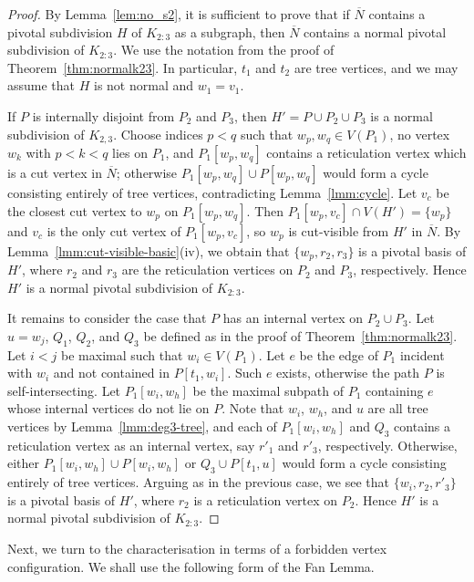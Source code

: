 \documentclass[pdflatex,sn-mathphys-num]{sn-jnl}
\theoremstyle{thmstyleone}%
\theoremstyle{thmstyletwo}%
\theoremstyle{thmstylethree}%
\begin{document}
\begin{proof}
By Lemma~\ref{lem:no_s2}, it is sufficient to prove that if $\overline{N}$ contains a pivotal subdivision $H$ of $K_{2:3}$ as a subgraph, then  $\overline{N}$ contains a normal pivotal subdivision of $K_{2:3}$.
We use the notation from the proof of Theorem~\ref{thm:normalk23}. In particular, $t_1$ and $t_2$ are tree vertices, and we may assume that $H$ is not normal and $w_1=v_1$.

If $P$ is internally disjoint from $P_2$ and $P_3$, then $H'=P \cup P_2 \cup P_3$ is a normal subdivision of $K_{2,3}$. 
Choose indices $p<q$ such that $w_p,w_q\in V(P_1)$, no vertex $w_k$ with $p<k<q$ lies on $P_1$, and $P_1[w_p,w_q]$ contains a reticulation vertex which is a cut vertex in $\overline{N}$; otherwise $P_1[w_p,w_q] \cup P[w_p,w_q] $ would form a cycle consisting entirely of tree vertices, contradicting Lemma~\ref{lmm:cycle}.
Let $v_c$ be the closest cut vertex to $w_p$ on $P_1[w_p,w_q]$. Then $P_1[w_p, v_c] \cap V(H')=\{w_p\}$ and $v_c$ is the only cut vertex of $P_1[w_p, v_c]$, so $w_p$ is cut-visible from $H'$ in $\overline{N}$. By Lemma~\ref{lmm:cut-visible-basic}(iv), we obtain that $\{w_p, r_2, r_3\}$ is a pivotal basis of $H'$, where $r_2$ and $r_3$ are the reticulation vertices on $P_2$ and $P_3$, respectively. Hence $H'$ is a normal pivotal subdivision of $K_{2:3}$.

It remains to consider the case that $P$ has an internal vertex on $P_2\cup P_3$. Let $u=w_j$, $Q_1$, $Q_2$, and $Q_3$ be defined as in the proof of Theorem~\ref{thm:normalk23}. Let $i<j$ be maximal such that $w_i\in V(P_1)$. Let $e$ be the edge of $P_1$ incident with $w_i$ and not contained in $P[t_1,w_i]$. Such $e$ exists, otherwise the path $P$ is self-intersecting. Let $P_1[w_i,w_h]$ be the maximal subpath of $P_1$ containing $e$ whose internal vertices do not lie on $P$. Note that $w_i$, $w_h$, and $u$ are all tree vertices by Lemma~\ref{lmm:deg3-tree}, and each of $P_1[w_i,w_h]$ and $Q_3$ contains a reticulation vertex as an internal vertex, say $r'_1$ and $r'_3$, respectively. Otherwise, either $P_1[w_i,w_h]\cup P[w_i,w_h]$ or $Q_3\cup P[t_1,u]$ would form a cycle consisting entirely of tree vertices. Arguing as in the previous case, we see that $\{w_i, r_2, r'_3\}$ is a pivotal basis of $H'$, where $r_2$ is a reticulation vertex on $P_2$. Hence $H'$ is a normal pivotal subdivision of $K_{2:3}$.
\end{proof}




Next, we turn to the characterisation in terms of a forbidden vertex configuration. We shall use the following form of the Fan Lemma.
\end{document}
